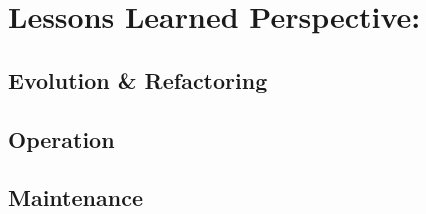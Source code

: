 \section{Lessons Learned Perspective:}

\subsection{Evolution \& Refactoring}
%
%



\subsection{Operation}

%

\subsection{Maintenance}
%
%


